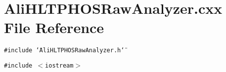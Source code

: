\section{Ali\-HLTPHOSRaw\-Analyzer.cxx File Reference}
\label{AliHLTPHOSRawAnalyzer_8cxx}


{\tt \#include \char`\"{}Ali\-HLTPHOSRaw\-Analyzer.h\char`\"{}}\par
{\tt \#include $<$iostream$>$}\par
